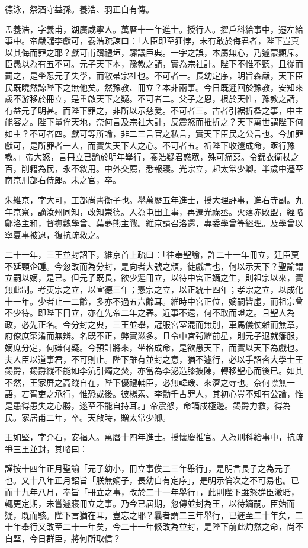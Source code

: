 \begin{pinyinscope}
德泳，祭酒守益孫。養浩、羽正自有傳。

孟養浩，字義甫，湖廣咸寧人。萬曆十一年進士。授行人。擢戶科給事中，遷左給事中。帝嚴譴李獻可，養浩疏諫曰：「人臣即至狂悖，未有敢於侮君者，陛下豈真以其侮而罪之耶？獻可甫躋禮垣，驟議巨典。一字之誤，本屬無心，乃遽蒙顯斥。臣愚以為有五不可。元子天下本，豫教之請，實為宗社計。陛下不惟不聽，且從而罰之，是坐忍元子失學，而敝帚宗社也。不可者一。長幼定序，明旨森嚴，天下臣民既曉然諒陛下之無他矣。然豫教、冊立？本非兩事。今日既遲回於豫教，安知來歲不游移於冊立，是重啟天下之疑。不可者二。父子之恩，根於天性，豫教之請，有益元子明甚。而陛下罪之，非所以示慈愛。不可者三。古者引裾折檻之事，中主能容之。陛下量侔天地，奈何言及宗社大計，反震怒而摧折之？天下萬世謂陛下何如主？不可者四。獻可等所論，非二三言官之私言，實天下臣民之公言也。今加罪獻可，是所罪者一人，而實失天下人之心。不可者五。祈陛下收還成命，亟行豫教。」帝大怒，言冊立已諭於明年舉行，養浩疑君惑眾，殊可痛惡。令錦衣衛杖之百，削籍為民，永不敘用。中外交薦，悉報寢。光宗立，起太常少卿。半歲中遷至南京刑部右侍郎。未之官，卒。

朱維京，字大可，工部尚書衡子也。舉萬歷五年進士，授大理評事，進右寺副。九年京察，謫汝州同知，改知崇德。入為屯田主事，再遷光祿丞。火落赤敗盟，經略鄭洛主和，督撫魏學曾、葉夢熊主戰。維京請召洛還，專委學曾等經理。及學曾以寧夏事被逮，復抗疏救之。

二十一年，三王並封詔下，維京首上疏曰：「往奉聖諭，許二十一年冊立，廷臣莫不延頸企踵。今忽改而為分封，是向者大號之頒，徒戲言也，何以示天下？聖諭謂立嗣以嫡，是已。但元子既長，欲少遲冊立，以待中宮正嫡之生，則祖宗以來，實無此制。考英宗之立，以宣德三年；憲宗之立，以正統十四年；孝宗之立，以成化十一年。少者止一二齡，多亦不過五六齡耳。維時中宮正位，嫡嗣皆虛，而祖宗曾不少待。即陛下冊立，亦在先帝二年之春。近事不遠，何不取而證之。且聖人為政，必先正名。今分封之典，三王並舉，冠服宮室混而無別，車馬儀仗雜而無章，府僚庶寀淆而無辨。名既不正，弊實滋多。且令中宮茍耀前星，則元子退就籓服，嫡庶分定，何嫌何疑。今預計將來，坐格成命，是欲愚天下，而實以天下為戲也。夫人臣以道事君，不可則止。陛下雖有並封之意，猶不遽行，必以手詔咨大學士王錫爵，錫爵縱不能如李沆引燭之焚，亦當為李泌造膝披陳，轉移聖心而後已。如其不然，王家屏之高蹤自在，陛下優禮輔臣，必無韓瑗、來濟之辱也。奈何噤無一語，若胥吏之承行，惟恐或後。彼楊素、李勣千古罪人，其初心豈不知有公論，惟是患得患失之心勝，遂至不能自持耳。」帝震怒，命謫戍極邊。錫爵力救，得為民。家居甫二年，卒。天啟時，贈太常少卿。

王如堅，字介石，安福人。萬曆十四年進士。授懷慶推官。入為刑科給事中，抗疏爭三王並封，其略曰：

謹按十四年正月聖諭「元子幼小，冊立事俟二三年舉行」，是明言長子之為元子也。又十八年正月詔旨「朕無嫡子，長幼自有定序」，是明示倫次之不可易也。已而十九年八月，奉旨「冊立之事，改於二十一年舉行」，此則陛下雖怒群臣激聒，輒更定期，未嘗遽寢冊立之事。乃今已屆期，忽傳並封為王，以待嫡嗣。臣始而疑，既而駭。陛下言猶在耳，豈忘之耶？曩者謂二三年舉行，已遲至二十年矣，二十年舉行又改至二十一年矣，今二十一年倏改為並封，是陛下前此灼然之命，尚不自堅，今日群臣，將何所取信？


\end{pinyinscope}
